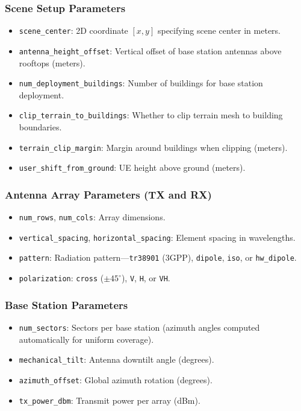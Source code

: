 \documentclass{article}
\begin{document}
\subsubsection{Scene Setup Parameters}
\begin{itemize}
  \item \texttt{scene\_center}: 2D coordinate $[x, y]$ specifying scene center in meters.
  \item \texttt{antenna\_height\_offset}: Vertical offset of base station antennas above rooftops (meters).
  \item \texttt{num\_deployment\_buildings}: Number of buildings for base station deployment.
  \item \texttt{clip\_terrain\_to\_buildings}: Whether to clip terrain mesh to building boundaries.
  \item \texttt{terrain\_clip\_margin}: Margin around buildings when clipping (meters).
  \item \texttt{user\_shift\_from\_ground}: UE height above ground (meters).
\end{itemize}

\subsubsection{Antenna Array Parameters (TX and RX)}
\begin{itemize}
  \item \texttt{num\_rows}, \texttt{num\_cols}: Array dimensions.
  \item \texttt{vertical\_spacing}, \texttt{horizontal\_spacing}: Element spacing in wavelengths.
  \item \texttt{pattern}: Radiation pattern---\texttt{tr38901} (3GPP), \texttt{dipole}, \texttt{iso}, or \texttt{hw\_dipole}.
  \item \texttt{polarization}: \texttt{cross} ($\pm 45^{\circ}$), \texttt{V}, \texttt{H}, or \texttt{VH}.
\end{itemize}

\subsubsection{Base Station Parameters}
\begin{itemize}
  \item \texttt{num\_sectors}: Sectors per base station (azimuth angles computed automatically for uniform coverage).
  \item \texttt{mechanical\_tilt}: Antenna downtilt angle (degrees).
  \item \texttt{azimuth\_offset}: Global azimuth rotation (degrees).
  \item \texttt{tx\_power\_dbm}: Transmit power per array (dBm).
\end{itemize}
\end{document}
